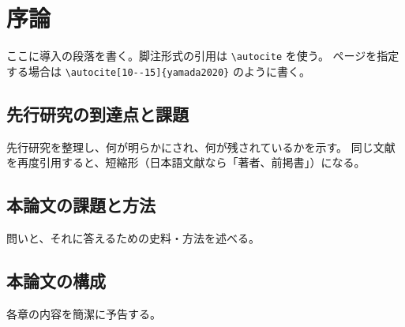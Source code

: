 \chapter{序論}

ここに導入の段落を書く。脚注形式の引用は \verb|\autocite| を使う\autocite{yamada2020}。
ページを指定する場合は \verb|\autocite[10--15]{yamada2020}| のように書く\autocite[10--15]{yamada2020}。

\section{先行研究の到達点と課題}

先行研究を整理し、何が明らかにされ、何が残されているかを示す\autocite[42]{smith2019}。
同じ文献を再度引用すると、短縮形（日本語文献なら「著者、前掲書」）になる\autocite[20]{yamada2020}。

\section{本論文の課題と方法}

問いと、それに答えるための史料・方法を述べる。

\section{本論文の構成}

各章の内容を簡潔に予告する。
